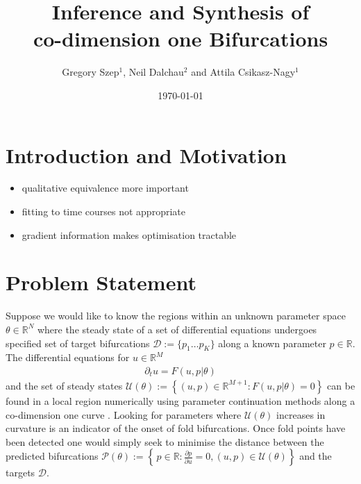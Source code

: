 \documentclass{article}[12pt]
\numberwithin{equation}{section}
\begin{document}
\title{
	Inference and Synthesis of\\
	co-dimension one Bifurcations
}

\author{Gregory Szep$^1$, Neil Dalchau$^2$ and Attila Csikasz-Nagy$^1$}
\date{\today}
\maketitle
\vspace{-25pt}
\section{Introduction and Motivation}

\begin{itemize}
\item qualitative equivalence more important
\item fitting to time courses not appropriate
\item gradient information makes optimisation tractable
\end{itemize}

\section{Problem Statement}

Suppose we would like to know the regions within an unknown parameter space $\theta\in\mathbb{R}^N$ where the steady state of a set of differential equations undergoes specified set of target bifurcations $\mathcal{D}:=\{p_1\dots p_K\}$ along a known parameter $p\in\mathbb{R}$. The differential equations for $u\in\mathbb{R}^M$
\begin{align}
	\partial_t u=F(u,p|\theta) 
\end{align}
and the set of steady states $\mathcal{U}(\theta) := \left\{ (u,p)\in\mathbb{R}^{M+1} : F(u,p|\theta) =0\right\}$ can be found in a local region numerically using
parameter continuation methods along a co-dimension one curve \cite{}.
Looking for parameters where  $\mathcal{U}(\theta)$ increases in curvature is an
indicator of the onset of fold bifurcations. Once fold points have been detected
one would simply seek to minimise the distance between the predicted bifurcations 
$\mathcal{P}(\theta):=\left\{\,p\in\mathbb{R}: \frac{\partial p}{\partial u}=0,(u,p)\in\mathcal{U}(\theta) \right\}$ and the targets $\mathcal{D}$.
\\\\
\end{document}
